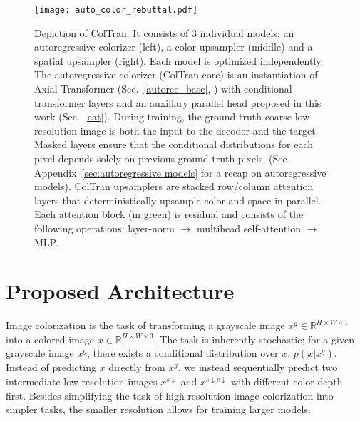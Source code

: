 \documentclass{article} \usepackage{iclr2021_conference,times}
\newcommand{\da}{{\scriptscriptstyle\downarrow}}
\begin{document}
\begin{figure}[t]
  \centering
  \texttt{[image: auto\_color\_rebuttal.pdf]}
  \caption{Depiction of ColTran. It consists of 3 individual models: an autoregressive colorizer (left), a color upsampler (middle) and a spatial upsampler (right). Each model is optimized independently. The autoregressive colorizer (ColTran core) is an instantiation of Axial Transformer (Sec.~\ref{autorec_base}, \citet{ho2019axial}) with conditional transformer layers and an auxiliary parallel head proposed in this work (Sec.~\ref{cat}). During training, the ground-truth coarse low resolution image is both the input to the decoder and the target. Masked layers ensure that the conditional distributions for each pixel depends solely on previous ground-truth pixels. (See Appendix~\ref{sec:autoregressive models} for a recap on autoregressive models). ColTran upsamplers are stacked row/column attention layers that deterministically upsample color and space in parallel. Each attention block (in green) is residual and consists of the following operations: layer-norm $\rightarrow$ multihead self-attention $\rightarrow$ MLP.}\label{fig:illustration}
\end{figure}

\section{Proposed Architecture}

Image colorization is the task of transforming a grayscale image $x^g \in \mathbb{R}^{H{\times}W{\times}1}$ into a colored image $x \in \mathbb{R}^{H{\times}W{\times}3}$. The task is inherently stochastic; for a given grayscale image $x^g$, there exists a conditional distribution over $x$, $p(x | x^g)$. Instead of predicting $x$ directly from $x^g$, we instead sequentially predict two intermediate low resolution images $x^{s\da}$ and $x^{s\da c\da}$ with different color depth first. Besides simplifying the task of high-resolution image colorization into simpler tasks, the smaller resolution allows for training larger models.
\end{document}
